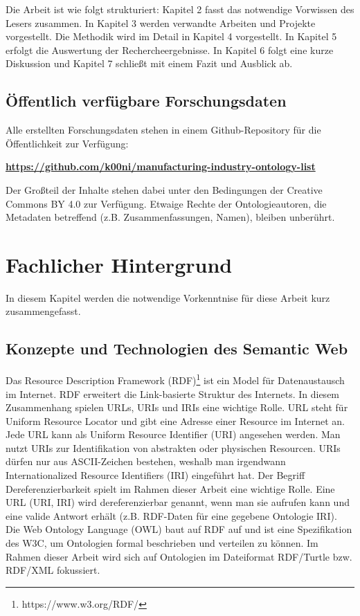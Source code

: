 \documentclass{article}
\begin{document}
Die Arbeit ist wie folgt strukturiert: Kapitel 2 fasst das notwendige Vorwissen des Lesers zusammen. In Kapitel 3 werden verwandte Arbeiten und Projekte vorgestellt. Die Methodik wird im Detail in Kapitel 4 vorgestellt. In Kapitel 5 erfolgt die Auswertung der Rechercheergebnisse. In Kapitel 6 folgt eine kurze Diskussion und Kapitel 7 schließt mit einem Fazit und Ausblick ab.

\subsection{Öffentlich verfügbare Forschungsdaten}

Alle erstellten Forschungsdaten stehen in einem Github-Repository für die Öffentlichkeit zur Verfügung:\linebreak

\textbf{\url{https://github.com/k00ni/manufacturing-industry-ontology-list}}\linebreak

Der Großteil der Inhalte stehen dabei unter den Bedingungen der Creative Commons BY 4.0 zur Verfügung.
Etwaige Rechte der Ontologieautoren, die Metadaten betreffend (z.B. Zusammenfassungen, Namen), bleiben unberührt.

\section{Fachlicher Hintergrund}

In diesem Kapitel werden die notwendige Vorkenntnise für diese Arbeit kurz zusammengefasst.

\subsection{Konzepte und Technologien des Semantic Web}

Das Resource Description Framework (RDF)\footnote{https://www.w3.org/RDF/} ist ein Model für Datenaustausch im Internet.
RDF erweitert die Link-basierte Struktur des Internets.
In diesem Zusammenhang spielen URLs, URIs und IRIs eine wichtige Rolle.
URL steht für Uniform Resource Locator und gibt eine Adresse einer Resource im Internet an.
Jede URL kann als Uniform Resource Identifier (URI) angesehen werden.
Man nutzt URIs zur Identifikation von abstrakten oder physischen Resourcen.
URIs dürfen nur aus ASCII-Zeichen bestehen, weshalb man irgendwann Internationalized Resource Identifiers (IRI) eingeführt hat.
Der Begriff Dereferenzierbarkeit spielt im Rahmen dieser Arbeit eine wichtige Rolle.
Eine URL (URI, IRI) wird dereferenzierbar genannt, wenn man sie aufrufen kann und eine valide Antwort erhält (z.B. RDF-Daten für eine gegebene Ontologie IRI).
Die Web Ontology Language (OWL) baut auf RDF auf und ist eine Spezifikation des W3C, um Ontologien formal beschrieben und verteilen zu können.
Im Rahmen dieser Arbeit wird sich auf Ontologien im Dateiformat RDF/Turtle bzw. RDF/XML fokussiert.
\end{document}
